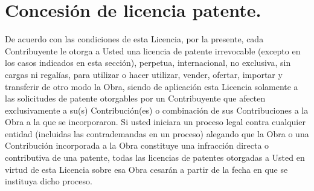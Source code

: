 \section{Concesión de licencia patente.}De acuerdo con las condiciones de esta Licencia, por la presente, cada Contribuyente le otorga a Usted una licencia de patente irrevocable (excepto en los casos indicados en esta sección), perpetua, internacional, no exclusiva, sin cargas ni regalías, para utilizar o hacer utilizar, vender, ofertar, importar y transferir de otro modo la Obra, siendo de aplicación esta Licencia solamente a las solicitudes de patente otorgables por un Contribuyente que afecten exclusivamente a su(s) Contribución(es) o combinación de sus Contribuciones a la Obra a la que se incorporaron. Si usted iniciara un proceso legal contra cualquier entidad (incluidas las contrademandas en un proceso) alegando que la Obra o una Contribución incorporada a la Obra constituye una infracción directa o contributiva de una patente, todas las licencias de patentes otorgadas a Usted en virtud de esta Licencia sobre esa Obra cesarán a partir de la fecha en que se instituya dicho proceso.\\\\
